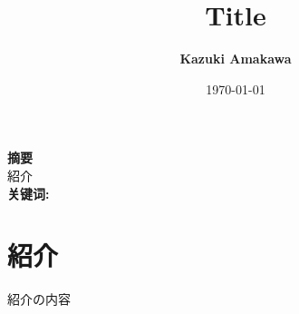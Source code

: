 \documentclass[UTF8]{ctexart}
\title{Title}
\author{\textbf{Kazuki Amakawa}}
\date{\today}
\theoremstyle{plain}
\begin{document}
\maketitle
\noindent \textbf{摘要}\\
紹介\\

\noindent \textbf{关键词:} \\[20ex]
\thispagestyle{empty}
\newpage
\tableofcontents
\thispagestyle{empty}
\newpage
\setcounter{page}{1}
\newpage
\section{紹介}
紹介の内容



%
%

\end{document}
